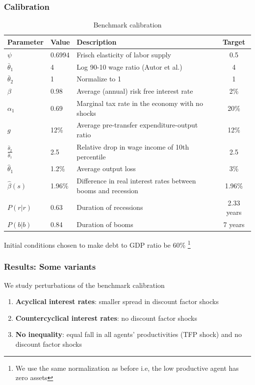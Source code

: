 \documentclass{beamer}
\begin{document}
\begin{frame}
 \frametitle{Calibration}

{\tiny
\begin{table}[htp]
{\tiny
\begin{tabular}{|l|l|l|c|}
\hline
Parameter & Value & Description &Target   \\ \hline
$\psi$ & 0.6994 &Frisch elasticity of labor supply & 0.5   \\
$\bar{\theta}_1 $ & 4& Log 90-10 wage ratio (Autor et al.) & 4   \\
$\bar{\theta}_2 $ & 1 &Normalize to 1 & 1  \\
$\beta$ & 0.98  &Average (annual) risk free interest rate & 2\%   \\
$\alpha_1$ & 0.69 & Marginal tax rate in the economy with no shocks & 20\% \\
$g$ & 12\%&Average pre-transfer expenditure-output ratio & 12\% \\
$\frac{\hat {\theta}_2}{\hat {\theta}_1}$ & 2.5 & Relative drop in wage income of 10th
percentile & 2.5\\
$\hat{\theta}_1$ & 1.2\% & Average output loss& 3\% \\
$\hat{\beta}(s)$ & 1.96\%& Difference in real interest rates between booms and recession& 1.96\% \\
$P(r|r)$ & 0.63&Duration of recessions & 2.33 years \\
$P(b|b)$ & 0.84 &Duration of booms &7 years \\ \hline
\end{tabular}
}
\caption{Benchmark calibration}
\label{tab:Parameters}
\end{table}
}
Initial conditions chosen to make  debt to GDP ratio be 60\% \footnote{We use the same normalization as before i.e, the low productive agent has zero assets}
 \end{frame}

\begin{frame}
 \frametitle{Results: Some variants }
 We study perturbations of the benchmark calibration
 \begin{enumerate}
\item \textbf{Acyclical interest rates}: smaller spread in discount factor shocks
\item \textbf{Countercyclical interest rates}: no discount factor shocks
\item \textbf{No inequality}: equal fall in all agents' productivities (TFP shock) and no discount factor shocks
\end{enumerate}

 \end{frame}
\end{document}
